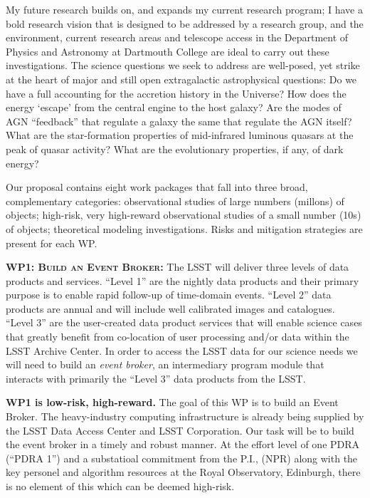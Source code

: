 \smallskip
\smallskip
\noindent
My future research builds on, and expands my current research program;
I have a bold research vision that is designed to be addressed by a
research group, and the environment, current research areas and
telescope access in the Department of Physics and Astronomy at Dartmouth College
are ideal to
carry out these investigations.
The science questions we seek to address are well-posed, yet strike at
the heart of major and still open extragalactic astrophysical
questions: Do we have a full accounting for the accretion history in
the Universe?  How does the energy `escape' from the central engine to
the host galaxy?  Are the modes of AGN ``feedback'' that regulate a
galaxy the same that regulate the AGN itself?  What are the
star-formation properties of mid-infrared luminous quasars at the peak
of quasar activity?  What are the evolutionary properties, if any, of
dark energy?

\smallskip
\smallskip
\noindent
Our proposal contains eight work packages that fall into three broad,
complementary categories: observational studies of large numbers
(millons) of objects; high-risk, very high-reward observational
studies of a small number (10s) of objects; theoretical modeling
investigations. Risks and mitigation strategies are present for each
WP.


\smallskip
\smallskip
\noindent
\textbf{\textsc{WP1: Build an Event Broker:}} 
The LSST will deliver three levels of data products and
services. ``Level 1'' are the nightly data products and their primary
purpose is to enable rapid follow-up of time-domain events. ``Level
2'' data products are annual and will include well calibrated images
and catalogues. ``Level 3'' are the user-created data product services
that will enable science cases that greatly benefit from co-location
of user processing and/or data within the LSST Archive Center. In
order to access the LSST data for our science needs we will need to
build an {\it event broker}, an intermediary program module that
interacts with primarily the ``Level 3'' data products from the LSST.

\noindent
{\bf WP1 is low-risk, high-reward.} 
The goal of this WP is to build an Event Broker.  The heavy-industry
computing infrastructure is already being supplied by the LSST Data
Access Center and LSST Corporation. Our task will be to build the
event broker in a timely and robust manner. At the effort level of one
PDRA (``PDRA 1'') and a substatioal commitment from the P.I., (NPR)
along with the key personel and algorithm resources at the Royal
Observatory, Edinburgh, there is no element of this which can be
deemed high-risk.


